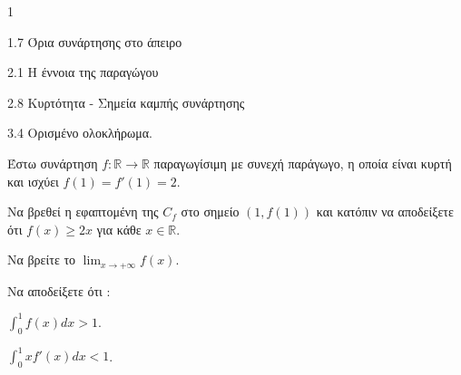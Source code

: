 \begin{ylh}{1}
    \item 1.7 Όρια συνάρτησης στο άπειρο
    \item 2.1 Η έννοια της παραγώγου
    \item 2.8 Κυρτότητα - Σημεία καμπής συνάρτησης
    \item 3.4 Ορισμένο ολοκλήρωμα.
\end{ylh}
Έστω συνάρτηση $f : \mathbb{R} \to \mathbb{R}$ παραγωγίσιμη με συνεχή παράγωγο, η οποία είναι κυρτή και ισχύει $f(1) = f'(1) = 2$.
\begin{alist}
\item Να βρεθεί η εφαπτομένη της $C_f$ στο σημείο $(1, f(1))$ και κατόπιν να αποδείξετε ότι $f(x) \ge 2x$ για κάθε $x \in \mathbb{R}$. 
\item Να βρείτε το $\lim_{x \to +\infty} f(x)$. 
\item Να αποδείξετε ότι :
    \begin{rlist}
    \item $\int_0^1 f(x)dx > 1$. 
    \item $\int_0^1 xf'(x)dx < 1$. 
    \end{rlist}
\end{alist}